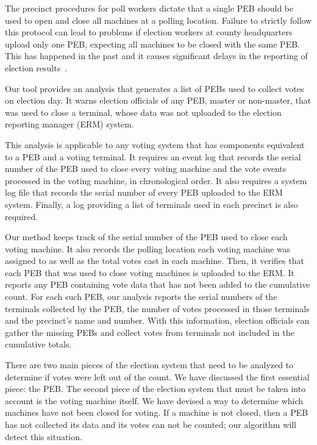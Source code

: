 \label{sec:pebs_not_uploaded}
The precinct procedures for poll workers dictate that a single PEB
should be used to open and close all machines at a polling
location. Failure to strictly follow this protocol can lead to problems if
election workers at county headquarters upload only one PEB, expecting all
machines to be closed with the same PEB. This has happened in the past and it 
causes significant delays in the reporting of election
results~\cite{Buell2011,Mazella2002}. 

Our
tool provides an analysis that generates a list of PEBs used to collect
votes on election day. It warns election officials of any PEB, master
or non-master, that was used to close a terminal, whose data was not
uploaded to the election reporting manager (ERM) system.  

This analysis is applicable to any voting system that has components
equivalent to a PEB and a voting terminal.  It requires an event log
that records the serial number of the PEB used to close every voting
machine and the vote events processed in the voting machine, in
chronological order. It also requires a system log file that records the
serial number of every PEB uploaded to the ERM 
system. Finally, a log providing a list of terminals used in each
precinct is also required.

Our method keeps track of the serial number of the PEB used to close each voting
machine. It also records the polling location each voting machine was assigned
to as well as the total votes cast in each machine. Then, it verifies that each
PEB that was used to close voting machines is uploaded to the ERM. It
reports any PEB containing vote data that has not been added to the cumulative
count.  For each such PEB, our analysis reports the serial numbers of the
terminals collected by the PEB, the number of votes processed in those terminals
and the precinct's name and number. With this information, election officials
can gather the missing PEBs and collect votes from terminals not included in the
cumulative totals.

There are two main pieces of the election system that need to be
analyzed to determine if votes were left out of the count.  We have
discussed the first essential piece: the PEB.  The second piece of the
election system that must be taken into account is the voting machine
itself.   We have devised a way to determine which machines have not
been closed for voting.  If a machine is not closed, then a PEB has
not collected its data and its votes can not be counted; our algorithm
will  detect this situation.   

